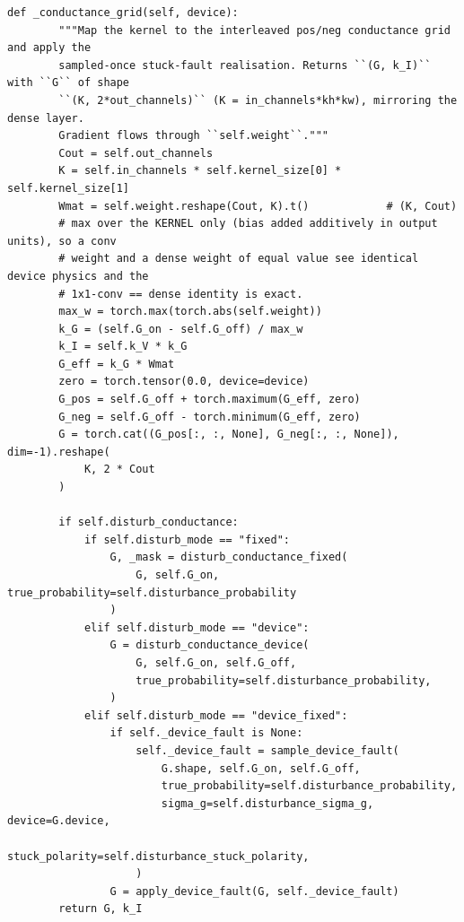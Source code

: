 \begin{lstlisting}[caption={mnn\_torch/layers.py},label={lst:mnn-src-layers}]
    def _conductance_grid(self, device):
        """Map the kernel to the interleaved pos/neg conductance grid and apply the
        sampled-once stuck-fault realisation. Returns ``(G, k_I)`` with ``G`` of shape
        ``(K, 2*out_channels)`` (K = in_channels*kh*kw), mirroring the dense layer.
        Gradient flows through ``self.weight``."""
        Cout = self.out_channels
        K = self.in_channels * self.kernel_size[0] * self.kernel_size[1]
        Wmat = self.weight.reshape(Cout, K).t()            # (K, Cout)
        # max over the KERNEL only (bias added additively in output units), so a conv
        # weight and a dense weight of equal value see identical device physics and the
        # 1x1-conv == dense identity is exact.
        max_w = torch.max(torch.abs(self.weight))
        k_G = (self.G_on - self.G_off) / max_w
        k_I = self.k_V * k_G
        G_eff = k_G * Wmat
        zero = torch.tensor(0.0, device=device)
        G_pos = self.G_off + torch.maximum(G_eff, zero)
        G_neg = self.G_off - torch.minimum(G_eff, zero)
        G = torch.cat((G_pos[:, :, None], G_neg[:, :, None]), dim=-1).reshape(
            K, 2 * Cout
        )

        if self.disturb_conductance:
            if self.disturb_mode == "fixed":
                G, _mask = disturb_conductance_fixed(
                    G, self.G_on, true_probability=self.disturbance_probability
                )
            elif self.disturb_mode == "device":
                G = disturb_conductance_device(
                    G, self.G_on, self.G_off,
                    true_probability=self.disturbance_probability,
                )
            elif self.disturb_mode == "device_fixed":
                if self._device_fault is None:
                    self._device_fault = sample_device_fault(
                        G.shape, self.G_on, self.G_off,
                        true_probability=self.disturbance_probability,
                        sigma_g=self.disturbance_sigma_g, device=G.device,
                        stuck_polarity=self.disturbance_stuck_polarity,
                    )
                G = apply_device_fault(G, self._device_fault)
        return G, k_I


\end{lstlisting}
